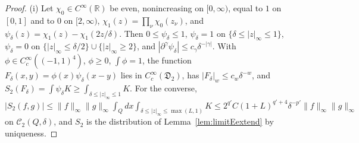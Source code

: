 \documentclass[aps,prd,twocolumn,superscriptaddress,nofootinbib,longbibliography,floatfix,amsmath,amssymb,10pt]{revtex4-2}
\theoremstyle{definition}
\theoremstyle{remark}
\newcommand{\R}{\mathbb{R}}
\begin{document}
\begin{proof}
(i) Let $\chi_0\in C^\infty(\R)$ be even, nonincreasing on $[0,\infty)$, equal
to $1$ on $[0,1]$ and to $0$ on $[2,\infty)$, $\chi_1(z)=\prod_\nu\chi_0(z_\nu)$,
and $\psi_\delta(z)=\chi_1(z)-\chi_1(2z/\delta)$. Then $0\le\psi_\delta\le1$,
$\psi_\delta=1$ on $\{\delta\le|z|_\infty\le1\}$, $\psi_\delta=0$ on
$\{|z|_\infty\le\delta/2\}\cup\{|z|_\infty\ge2\}$, and $|\partial^\gamma
\psi_\delta|\le c_\gamma\delta^{-|\gamma|}$. With $\phi\in C^\infty_c((-1,
1)^4)$, $\phi\ge0$, $\int\phi=1$, the function $F_\delta(x,y)=\phi(x)
\psi_\delta(x-y)$ lies in $C^\infty_c(\mathfrak D_2)$, has $|F_\delta|_w\le c_w
\delta^{-w}$, and $S_2(F_\delta)=\int\psi_\delta K\ge\int_{\delta\le|z|_\infty
\le1}K$. For the converse, $|S_2(f,g)|\le\|f\|_\infty\|g\|_\infty\int_Qdx\int_{
\delta\le|z|_\infty\le\max(L,1)}K\le2^{q'}C(1+L)^{q'+4}\delta^{-p'}\|f\|_\infty
\|g\|_\infty$ on $\mathcal C_2(Q,\delta)$, and $S_2$ is the distribution of
Lemma~\ref{lem:limitEextend} by uniqueness.


\end{proof}
\end{document}

